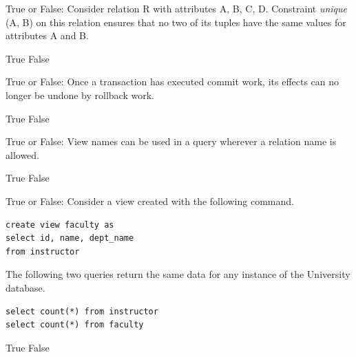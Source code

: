 \documentclass[12pt, addpoints, answers]{exam}
\begin{document}
\begin{questions}
\begin{minipage}{\linewidth}
\question[2]
True or False: Consider relation R with attributes A, B, C, D. Constraint \textit{unique} (A, B) on this relation 
ensures that no two of its tuples have the same values for attributes A and B.\par\vspace{0.5em}
\begin{checkboxes}
    \CorrectChoice True
    \choice False
\end{checkboxes}
\end{minipage}\vspace{1em}

\begin{minipage}{\linewidth}
\question[2]
True or False: Once a transaction has executed commit work, its effects can no longer be undone by rollback work.\par\vspace{0.5em}
\begin{checkboxes}
    \CorrectChoice True
    \choice False
\end{checkboxes}
\end{minipage}\vspace{1em}

\begin{minipage}{\linewidth}
\question[2]
True or False: View names can be used in a query wherever a relation name is allowed.\par\vspace{0.5em}
\begin{checkboxes}
    \CorrectChoice True
    \choice False
\end{checkboxes}
\end{minipage}\vspace{1em}

\begin{minipage}{\linewidth}
\question[2]
True or False: Consider a view created with the following command.\par\vspace{0.5em}
\begin{verbatim}
create view faculty as
select id, name, dept_name
from instructor
\end{verbatim}
The following two queries return the same data for any instance of the University database.\par\vspace{0.5em}
\begin{verbatim}
select count(*) from instructor
select count(*) from faculty
\end{verbatim}
\begin{checkboxes}
    \CorrectChoice True
    \choice False
\end{checkboxes}
\end{minipage}\vspace{1em}


\end{questions}
\end{document}
